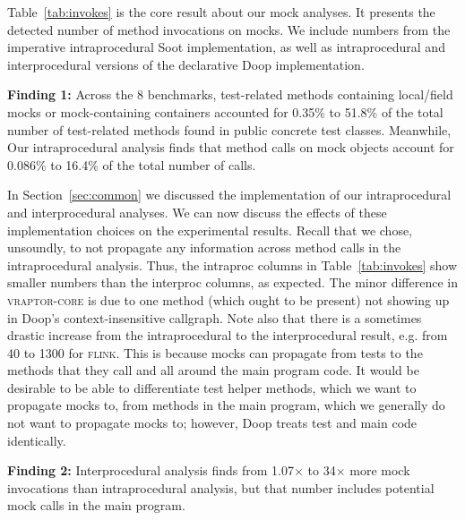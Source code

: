 Table~\ref{tab:invokes} is the core result about our mock analyses. It presents the detected number of method invocations on mocks. We include numbers from the imperative intraprocedural Soot implementation, as well as intraprocedural and interprocedural versions of the declarative Doop implementation.

\begin{mdframed}[
  leftmargin=\parindent,
  rightmargin=\parindent,
  skipabove=\topsep,
  skipbelow=\topsep
  ]
{\bf Finding 1:} Across the 8 benchmarks, test-related methods containing local/field mocks or mock-containing containers accounted for 0.35\% to 51.8\% of the total number of test-related methods found in public concrete test classes. Meanwhile, Our intraprocedural analysis finds that method calls on mock objects account for 0.086\% to 16.4\% of the total number of calls. 
\end{mdframed}


In Section~\ref{sec:common} we discussed the implementation of our intraprocedural and interprocedural analyses. We can now discuss the effects of these implementation choices on the experimental results. Recall that we chose, unsoundly, to not propagate any information across method calls in the intraprocedural analysis. Thus, the intraproc columns in Table~\ref{tab:invokes} show smaller numbers than the interproc columns, as expected. The minor difference in \textsc{vraptor-core} is due to one method (which ought to be present) not showing up in Doop's context-insensitive callgraph. Note also that there is a sometimes drastic increase from the intraprocedural to the interprocedural result, e.g. from 40 to 1300 for \textsc{flink}. This is because mocks can propagate from tests to the methods that they call and all around the main program code. It would be desirable to be able to differentiate test helper methods, which we want to propagate mocks to, from methods in the main program, which we generally do not want to propagate mocks to; however, Doop treats test and main code identically.

\begin{mdframed}[
  leftmargin=\parindent,
  rightmargin=\parindent,
  skipabove=\topsep,
  skipbelow=\topsep
  ]
{\bf Finding 2:} Interprocedural analysis finds from 1.07$\times$ to 34$\times$ more mock invocations than intraprocedural analysis, but that number includes potential mock calls in the main program.
\end{mdframed}

